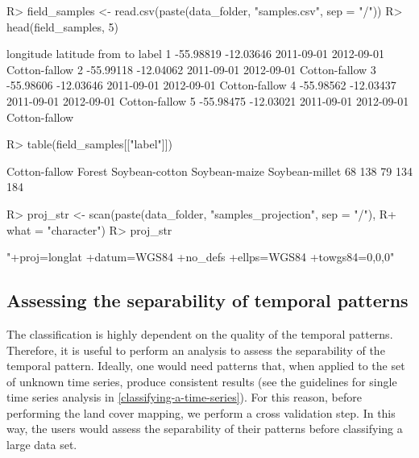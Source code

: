 \documentclass[article,shortnames]{jss}
\begin{document}
\begin{CodeChunk}

\begin{CodeInput}
R> field_samples <- read.csv(paste(data_folder, "samples.csv", sep = "/"))
R> head(field_samples, 5)
\end{CodeInput}

\begin{CodeOutput}
  longitude  latitude       from         to         label
1 -55.98819 -12.03646 2011-09-01 2012-09-01 Cotton-fallow
2 -55.99118 -12.04062 2011-09-01 2012-09-01 Cotton-fallow
3 -55.98606 -12.03646 2011-09-01 2012-09-01 Cotton-fallow
4 -55.98562 -12.03437 2011-09-01 2012-09-01 Cotton-fallow
5 -55.98475 -12.03021 2011-09-01 2012-09-01 Cotton-fallow
\end{CodeOutput}

\begin{CodeInput}
R> table(field_samples[["label"]])
\end{CodeInput}

\begin{CodeOutput}

 Cotton-fallow         Forest Soybean-cotton  Soybean-maize Soybean-millet 
            68            138             79            134            184 
\end{CodeOutput}

\begin{CodeInput}
R> proj_str <- scan(paste(data_folder, "samples_projection", sep = "/"), 
R+   what = "character")
R> proj_str
\end{CodeInput}

\begin{CodeOutput}
[1] "+proj=longlat +datum=WGS84 +no_defs +ellps=WGS84 +towgs84=0,0,0"
\end{CodeOutput}
\end{CodeChunk}

\hypertarget{assessing-the-separability-of-temporal-patterns}{%
\subsection{Assessing the separability of temporal
patterns}\label{assessing-the-separability-of-temporal-patterns}}

The classification is highly dependent on the quality of the temporal
patterns. Therefore, it is useful to perform an analysis to assess the
separability of the temporal pattern. Ideally, one would need patterns
that, when applied to the set of unknown time series, produce consistent
results (see the guidelines for single time series analysis in
\autoref{classifying-a-time-series}). For this reason, before performing
the land cover mapping, we perform a cross validation step. In this way,
the users would assess the separability of their patterns before
classifying a large data set.
\end{document}
